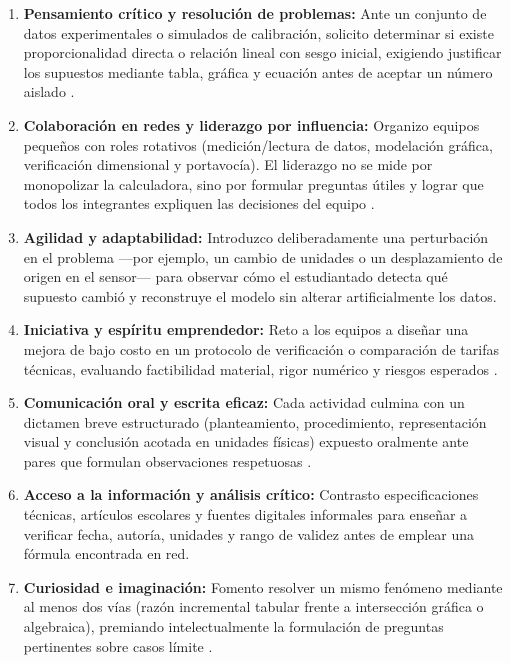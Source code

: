 \documentclass[spanish,letterpaper,oneside]{article}
\begin{document}
\begin{enumerate}
  \item \textbf{Pensamiento crítico y resolución de problemas:} Ante un conjunto de datos experimentales o simulados de calibración, solicito determinar si existe proporcionalidad directa o relación lineal con sesgo inicial, exigiendo justificar los supuestos mediante tabla, gráfica y ecuación antes de aceptar un número aislado \citep{wagner2010survival,star2015algebra}.
  \item \textbf{Colaboración en redes y liderazgo por influencia:} Organizo equipos pequeños con roles rotativos (medición/lectura de datos, modelación gráfica, verificación dimensional y portavocía). El liderazgo no se mide por monopolizar la calculadora, sino por formular preguntas útiles y lograr que todos los integrantes expliquen las decisiones del equipo \citep{sawyer2008optimizing}.
  \item \textbf{Agilidad y adaptabilidad:} Introduzco deliberadamente una perturbación en el problema —por ejemplo, un cambio de unidades o un desplazamiento de origen en el sensor— para observar cómo el estudiantado detecta qué supuesto cambió y reconstruye el modelo sin alterar artificialmente los datos.
  \item \textbf{Iniciativa y espíritu emprendedor:} Reto a los equipos a diseñar una mejora de bajo costo en un protocolo de verificación o comparación de tarifas técnicas, evaluando factibilidad material, rigor numérico y riesgos esperados \citep{scott2015futuro2}.
  \item \textbf{Comunicación oral y escrita eficaz:} Cada actividad culmina con un dictamen breve estructurado (planteamiento, procedimiento, representación visual y conclusión acotada en unidades físicas) expuesto oralmente ante pares que formulan observaciones respetuosas \citep{eef2021feedback}.
  \item \textbf{Acceso a la información y análisis crítico:} Contrasto especificaciones técnicas, artículos escolares y fuentes digitales informales para enseñar a verificar fecha, autoría, unidades y rango de validez antes de emplear una fórmula encontrada en red.
  \item \textbf{Curiosidad e imaginación:} Fomento resolver un mismo fenómeno mediante al menos dos vías (razón incremental tabular frente a intersección gráfica o algebraica), premiando intelectualmente la formulación de preguntas pertinentes sobre casos límite \citep{wagner2010survival}.
\end{enumerate}
\end{document}
